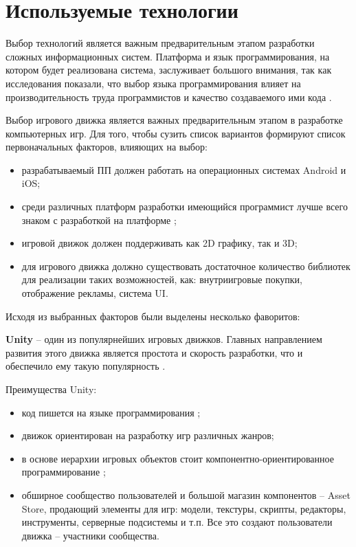 \section{Используемые технологии}

Выбор технологий является важным предварительным этапом разработки сложных информационных систем.
Платформа и язык программирования, на котором будет реализована система, заслуживает большого внимания, так как исследования показали, что выбор языка программирования влияет на производительность труда программистов и качество создаваемого ими кода \cite{CodeComplete}.

Выбор игрового движка является важных предварительным этапом в разработке компьютерных игр. Для того, чтобы сузить список вариантов формируют список первоначальных факторов, влияющих на выбор:
\begin{itemize}
    \item разрабатываемый ПП должен работать на операционных системах Android и iOS;
    \item среди различных платформ разработки имеющийся программист лучше всего знаком с разработкой на платформе \DotNet;
    \item игровой движок должен поддерживать как 2D графику, так и 3D;
    \item для игрового движка должно существовать достаточное количество библиотек для реализации таких возможностей, как: внутриигровые покупки, отображение рекламы, система UI.
\end{itemize}

Исходя из выбранных факторов были выделены несколько фаворитов:

\textbf{Unity} -- один из популярнейших игровых движков. Главных направлением развития этого движка является простота и скорость разработки, что и обеспечило ему такую популярность \cite{Unity}.

Преимущества Unity:
\begin{itemize}
    \item код пишется на языке программирования \CSharp;
    \item движок ориентирован на разработку игр различных жанров;
    \item в основе иерархии игровых объектов стоит компонентно-ориенти\-рованное программирование \cite{COP};
    \item обширное сообщество пользователей и большой магазин компонентов -- Asset Store, продающий элементы для игр: модели, текстуры, скрипты, редакторы, инструменты, серверные подсистемы и т.п. Все это создают пользователи движка -- участники сообщества.
\end{itemize}

